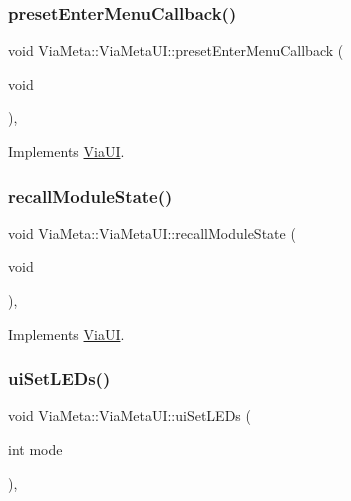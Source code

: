 \subsubsection{\texorpdfstring{preset\+Enter\+Menu\+Callback()}{presetEnterMenuCallback()}}
{\footnotesize\ttfamily void Via\+Meta\+::\+Via\+Meta\+U\+I\+::preset\+Enter\+Menu\+Callback (\begin{DoxyParamCaption}\item[{void}]{ }\end{DoxyParamCaption})\hspace{0.3cm}{\ttfamily [override]}, {\ttfamily [virtual]}}



Implements \mbox{\hyperlink{class_via_u_i_ad4dfd9fa424267358cab83bec4ee1f23}{Via\+UI}}.

\mbox{\label{class_via_meta_1_1_via_meta_u_i_a40b2c4c2139c78f273d923fdb0d3f4ce}} 
\subsubsection{\texorpdfstring{recall\+Module\+State()}{recallModuleState()}}
{\footnotesize\ttfamily void Via\+Meta\+::\+Via\+Meta\+U\+I\+::recall\+Module\+State (\begin{DoxyParamCaption}\item[{void}]{ }\end{DoxyParamCaption})\hspace{0.3cm}{\ttfamily [override]}, {\ttfamily [virtual]}}



Implements \mbox{\hyperlink{class_via_u_i_ac5b88708650fe41ea955c77de580f6f5}{Via\+UI}}.

\mbox{\label{class_via_meta_1_1_via_meta_u_i_a54f7dbc780758a9842836a9cdd3239a0}} 
\subsubsection{\texorpdfstring{ui\+Set\+L\+E\+Ds()}{uiSetLEDs()}}
{\footnotesize\ttfamily void Via\+Meta\+::\+Via\+Meta\+U\+I\+::ui\+Set\+L\+E\+Ds (\begin{DoxyParamCaption}\item[{int}]{mode }\end{DoxyParamCaption})\hspace{0.3cm}{\ttfamily [override]}, {\ttfamily [virtual]}}



